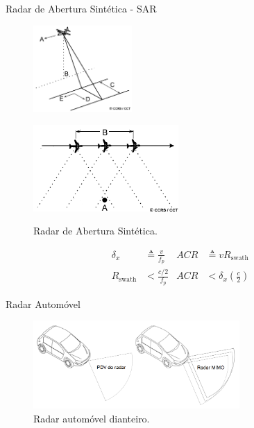 \documentclass[portuguese]{beamer}
\begin{document}
\begin{frame}{Radar de Abertura Sintética - SAR}
	\begin{figure}
		\centering
		\begin{minipage}[t]{0.43\textwidth}
			\centering
			\includegraphics[height=3.3cm]{../report/graphics/radgeom.png}
			\label{subfig:sar-side}
		\end{minipage}
		\hfill
		\begin{minipage}[t]{0.43\textwidth}
			\centering
			\includegraphics[height=3.3cm]{../report/graphics/sar.png}
			\label{subfig:sar-timesteps}
		\end{minipage}
		\caption{Radar de Abertura Sintética.}
		\label{fig:nrcan}
	\end{figure}
	\begin{align*}
		\delta_x &\triangleq \frac{v}{f_p}
		& ACR &\triangleq vR_{\textrm{swath}} \\
		R_{\textrm{swath}} &< \frac{c/2}{f_p}
		& ACR &< \delta_x\left(\frac{c}{2}\right)
	\end{align*}
\end{frame}

\begin{frame}{Radar Automóvel}
	\begin{figure}
		\centering
		\includegraphics[width=0.7\textwidth]{../report/graphics/auto.png}
		\caption{Radar automóvel dianteiro.}
		\label{fig:autorad}
	\end{figure}
\end{frame}
\end{document}
